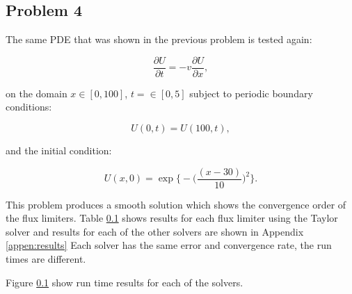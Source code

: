 \clearpage

\subsection{Problem 4}

The same PDE that was shown in the previous problem is tested again:

\begin{equation}
    \frac{\partial U}{\partial t} = -v\frac{\partial U}{\partial x},
    \label{eq:convection_PDE}
\end{equation}

\noindent on the domain $x \in [0, 100]$, $t =\in [0, 5]$ subject to periodic boundary conditions:

\begin{equation}
    U(0,t) = U(100, t),
\end{equation}

\noindent and the initial condition:

\begin{equation}
    U(x,0) = \exp\bigg\{-\bigg(\frac{(x-30)}{10}\bigg)^{2}\bigg\}.
\end{equation}

\noindent This problem produces a smooth solution which shows the convergence order of the flux limiters. Table \ref{} shows results for each flux limiter using the Taylor solver and results for each of the other solvers are shown in Appendix \ref{appen:results} Each solver has the same error and convergence rate, the run times are different. 

Figure \ref{} show run time results for each of the solvers. 

\clearpage


